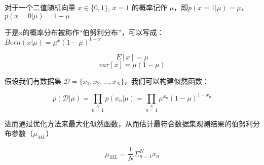 对于一个二值随机向量 $x\in \{0, 1\}$, $x = 1$ 的概率记作 $\mu$，即$p(x=1|\mu) = \mu$，$p(x=0|\mu) = 1 - \mu$

于是x的概率分布被称作“伯努利分布”，可以写成：
$Bern(x|\mu) = \mu^x(1-\mu)^{1-x}$


$$E[x] = \mu$$
$$var[x] = \mu(1-\mu)$$

假设我们有数据集 $\mathcal{D} = \{x_1, x_2, \dots, x_N\}$，我们可以构建似然函数：

$$p(\mathcal{D}|\mu)=\prod\limits_{n=1}\limits^{N}p(x_n|\mu)=\prod\limits_{n=1}\limits^{N} \mu^{x_n}(1-\mu)^{1-x_n}$$

进而通过优化方法来最大化似然函数，从而估计最符合数据集观测结果的伯努利分布参数（$\mu_{ML}$）

$$\mu_{ML} = \frac{1}{N}\Sigma_{n=1}^{N}x_n$$